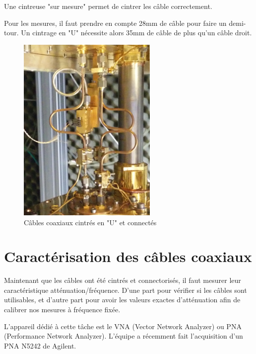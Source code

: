Une cintreuse "sur mesure" permet de cintrer les câble correctement.

Pour les mesures, il faut prendre en compte 28mm de câble pour faire un demi-tour. Un cintrage en "U" nécessite alors 35mm de câble de plus qu'un câble droit.

\begin{figure}[h]
    \begin{center}
        \includegraphics[width=0.60\textwidth]{Images/Coax/cintrage}
        \caption{Câbles coaxiaux cintrés en "U" et connectés}
        \label{coax_cintrage}
    \end{center}
\end{figure}




\chapter{Caractérisation des câbles coaxiaux}

Maintenant que les câbles ont été cintrés et connectorisés, il faut mesurer leur caractéristique atténuation/fréquence. D'une part pour vérifier si les câbles sont utilisables, et d'autre part pour avoir les valeurs exactes d'atténuation afin de calibrer nos mesures à fréquence fixée.

L'appareil dédié à cette tâche est le VNA (Vector Network Analyzer) ou PNA (Performance Network Analyzer). L'équipe a récemment fait l'acquisition d'un PNA N5242 de Agilent.

